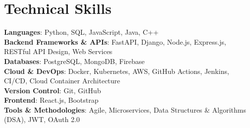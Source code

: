 \documentclass[letterpaper,11pt]{article}
\begin{document}
\section{Technical Skills}
 \begin{itemize}[leftmargin=0.15in, label={}]
    \small{\item{
     
     \textbf{Languages}: Python, SQL, JavaScript, Java, C++ \\
     
     \textbf{Backend Frameworks \& APIs}: FastAPI, Django, Node.js, Express.js, RESTful API Design, Web Services \\
     
     \textbf{Databases}: PostgreSQL, MongoDB, Firebase \\
     
     \textbf{Cloud \& DevOps}: Docker, Kubernetes, AWS, GitHub Actions, Jenkins, CI/CD, Cloud Container Architecture \\
     
     \textbf{Version Control}: Git, GitHub \\
     
     \textbf{Frontend}: React.js, Bootstrap \\
     
     \textbf{Tools \& Methodologies}: Agile, Microservices, Data Structures \& Algorithms (DSA), JWT, OAuth 2.0 \\
     
    }}
 \end{itemize}
\end{document}
